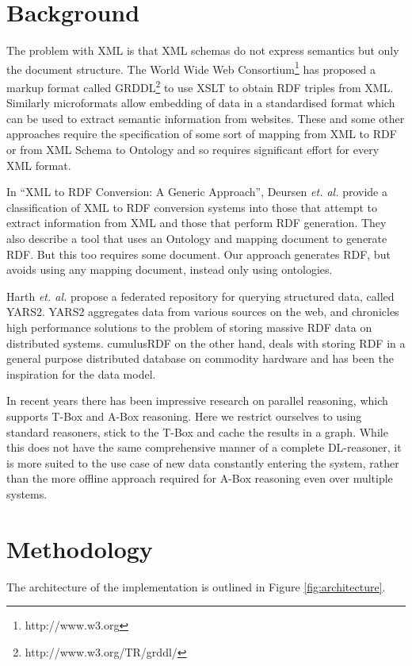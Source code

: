 \documentclass[journal]{IEEEtran}
\begin{document}
\section{Background}
\label{sec:background}

The problem with XML is that XML schemas do not express semantics but only the
document structure.  The World Wide Web Consortium\footnote{http://www.w3.org}
has proposed a markup format called GRDDL\footnote{http://www.w3.org/TR/grddl/}
to use XSLT to obtain RDF triples from XML. Similarly
microformats\cite{Khare:06} allow embedding of data in a standardised format
which can be used to extract semantic information from websites. These and some
other approaches\cite{Akh08xsp} require the specification
of some sort of mapping from XML to RDF or from XML Schema to Ontology and so
requires significant effort for every XML format.

In ``XML to RDF Conversion: A Generic Approach''\cite{Deur08xml},  Deursen
\emph{et. al.} provide a classification of XML to RDF conversion systems into
those that attempt to extract information from XML and those that perform RDF
generation. They also describe a tool that uses an Ontology and mapping
document to generate RDF. But this too requires some document. Our approach
generates RDF, but avoids using any mapping document, instead only using
ontologies.

Harth \emph{et. al.} propose a federated repository for querying structured
data, called YARS2\cite{Harth07yars2}. YARS2 aggregates data from various
sources on the web, and chronicles high performance solutions to the problem of
storing massive RDF data on distributed systems. cumulusRDF\cite{ladwig:11} on
the other hand, deals with storing RDF in a general purpose distributed
database on commodity hardware and has been the inspiration for the data model.

In recent years there has been impressive research on parallel
reasoning\cite{Weaver09par}\cite{Urb09sca}, which supports T-Box and A-Box
reasoning. Here we restrict ourselves to using standard reasoners, stick to the
T-Box and cache the results in a graph. While this does not have the same
comprehensive manner of a complete DL-reasoner, it is more suited to the use
case of new data constantly entering the system, rather than the more offline
approach required for A-Box reasoning even over multiple systems.

\section{Methodology}
The architecture of the implementation is outlined in Figure \ref{fig:architecture}.
\end{document}
